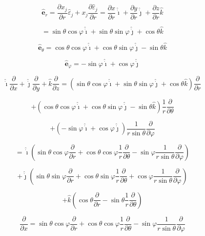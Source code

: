 \documentclass[12pt]{article}
\begin{document}
\[
    \hat{\textbf{e}}_r = \frac{\partial x_j}{\partial r} \hat{\varepsilon}_j
    + x_j \frac{\partial \hat{\varepsilon}_j}{\partial r} = \frac{\partial x}{\partial r} \hat{\dot{\imath}}
    + \frac{\partial y}{\partial r} \hat{\dot{\jmath}} + \frac{\partial z}{\partial r} \hat{k}
\]

\[
    = \sin{\theta} \cos{\varphi} \hat{\dot{\imath}} + \sin{\theta} \sin{\varphi} \hat{\dot{\jmath}}
    + \cos{\theta} \hat{k}
\]

\[
    \hat{\textbf{e}}_\theta = \cos{\theta} \cos{\varphi} \hat{\dot{\imath}}
    + \cos{\theta} \sin{\varphi} \hat{\dot{\jmath}} - \sin{\theta} \hat{k}
\]

\[
    \hat{\textbf{e}}_\varphi = -\sin{\varphi} \hat{\dot{\imath}} + \cos{\varphi} \hat{\dot{\jmath}}
\]

\[
    \hat{\dot{\imath}} \frac{\partial}{\partial x} + \hat{\dot{\jmath}} \frac{\partial}{\partial y}
    +  \hat{k} \frac{\partial}{\partial z} =
    \left(
    \sin{\theta} \cos{\varphi} \hat{\dot{\imath}}
    + \sin{\theta} \sin{\varphi} \hat{\dot{\jmath}}
    + \cos{\theta} \hat{k}
    \right)  \frac{\partial}{\partial r}
\]

\[
    + \left(
    \cos{\theta} \cos{\varphi} \hat{\dot{\imath}} + \cos{\theta} \sin{\varphi} \hat{\dot{\jmath}}
    - \sin{\theta} \hat{k}
    \right) \frac{1}{r} \frac{\partial}{\partial \theta}
\]

\[
    + \left(-\sin{\varphi} \hat{\dot{\imath}} + \cos{\varphi} \hat{\dot{\jmath}}\right)
    \frac{1}{r \sin{\theta}} \frac{\partial}{\partial \varphi}
\]

\[
    = \hat{\dot{\imath}}
    \left(
    \sin{\theta} \cos{\varphi} \frac{\partial}{\partial r}
    + \cos{\theta} \cos{\varphi} \frac{1}{r} \frac{\partial}{\partial \theta}
    - \sin{\varphi} \frac{1}{r \sin{\theta}} \frac{\partial}{\partial \varphi}
    \right)
\]

\[
    + \hat{\dot{\jmath}}
    \left(
    \sin{\theta} \sin{\varphi} \frac{\partial}{\partial r}
    + \cos{\theta} \sin{\varphi} \frac{1}{r} \frac{\partial}{\partial \theta}
    + \cos{\varphi} \frac{1}{r \sin{\theta}} \frac{\partial}{\partial \varphi}
    \right)
\]

\[
    + \hat{k} \left(\cos{\theta} \frac{\partial}{\partial r}
    - \sin{\theta} \frac{1}{r} \frac{\partial}{\partial \theta} \right)
\]

\[
    \frac{\partial}{\partial x} = \sin{\theta} \cos{\varphi} \frac{\partial}{\partial r}
    + \cos{\theta} \cos{\varphi} \frac{1}{r} \frac{\partial}{\partial \theta}
    - \sin{\varphi} \frac{1}{r \sin{\theta}} \frac{\partial}{\partial \varphi}
\]
\end{document}
